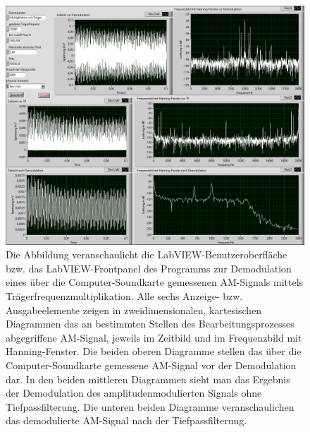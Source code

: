\documentclass[
a4paper,
12pt,
pagesize,
ngerman
]{scrartcl}
\begin{document}
	\begin{figure}[H]
		\centering
		\includegraphics[width=1.0\textwidth]{EIRE2018Dateien/Tag4/traegerMultOszi/Oszilloskop__modifiziertp}
		\caption{Die Abbildung veranschaulicht die LabVIEW-Benutzeroberfläche bzw. das LabVIEW-Frontpanel des Programms zur Demodulation eines über die Computer-Soundkarte gemessenen AM-Signals mittels Trägerfrequenzmultiplikation. Alle sechs Anzeige- bzw. Ausgabeelemente zeigen in zweidimensionalen, kartesischen Diagrammen das an bestimmten Stellen des Bearbeitungsprozesses abgegriffene AM-Signal, jeweils im Zeitbild und im Frequenzbild mit Hanning-Fenster. Die beiden oberen Diagramme stellen das über die Computer-Soundkarte gemessene AM-Signal vor der Demodulation dar. In den beiden mittleren Diagrammen sieht man das Ergebnis der Demodulation des amplitudenmodulierten Signals ohne Tiefpassfilterung. Die unteren beiden Diagramme veranschaulichen das demodulierte AM-Signal nach der Tiefpassfilterung.}
		\label{MultiTraegerFrontpanel}
	\end{figure}
\end{document}
